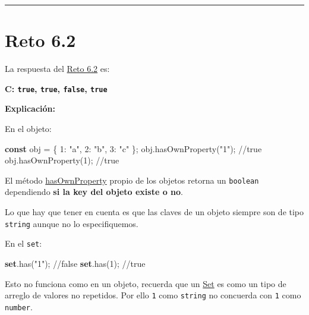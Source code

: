 \documentclass[
  letterpaper,
  DIV=11,
  numbers=noendperiod]{scrreprt}
\newenvironment{Shaded}{\begin{snugshade}}{\end{snugshade}}
\newcommand{\CommentTok}[1]{\textcolor[rgb]{0.37,0.37,0.37}{#1}}
\newcommand{\DecValTok}[1]{\textcolor[rgb]{0.68,0.00,0.00}{#1}}
\newcommand{\FunctionTok}[1]{\textcolor[rgb]{0.28,0.35,0.67}{#1}}
\newcommand{\KeywordTok}[1]{\textcolor[rgb]{0.00,0.23,0.31}{\textbf{#1}}}
\newcommand{\NormalTok}[1]{\textcolor[rgb]{0.00,0.23,0.31}{#1}}
\newcommand{\OperatorTok}[1]{\textcolor[rgb]{0.37,0.37,0.37}{#1}}
\newcommand{\StringTok}[1]{\textcolor[rgb]{0.13,0.47,0.30}{#1}}
\begin{document}
\begin{center}\rule{0.5\linewidth}{0.5pt}\end{center}

\section{Reto 6.2}\label{sec-sol-cap6-reto2}

La respuesta del \hyperref[sec-cap6-reto2]{Reto 6.2} es:

\textbf{C: \texttt{true}, \texttt{true}, \texttt{false}, \texttt{true}}

\textbf{Explicación:}

En el objeto:

\begin{Shaded}
\begin{Highlighting}[]
\KeywordTok{const}\NormalTok{ obj }\OperatorTok{=}\NormalTok{ \{ }\DecValTok{1}\OperatorTok{:} \StringTok{"a"}\OperatorTok{,} \DecValTok{2}\OperatorTok{:} \StringTok{"b"}\OperatorTok{,} \DecValTok{3}\OperatorTok{:} \StringTok{"c"}\NormalTok{ \}}\OperatorTok{;}
\NormalTok{obj}\OperatorTok{.}\FunctionTok{hasOwnProperty}\NormalTok{(}\StringTok{"1"}\NormalTok{)}\OperatorTok{;} \CommentTok{//true}
\NormalTok{obj}\OperatorTok{.}\FunctionTok{hasOwnProperty}\NormalTok{(}\DecValTok{1}\NormalTok{)}\OperatorTok{;} \CommentTok{//true}
\end{Highlighting}
\end{Shaded}

El método \hyperref[glos-hasownproperty]{hasOwnProperty} propio de los
objetos retorna un \texttt{boolean} dependiendo \textbf{si la key del
objeto existe o no}.

Lo que hay que tener en cuenta es que las claves de un objeto siempre
son de tipo \texttt{string} aunque no lo especifiquemos.

En el \texttt{set}:

\begin{Shaded}
\begin{Highlighting}[]
\KeywordTok{set}\OperatorTok{.}\FunctionTok{has}\NormalTok{(}\StringTok{"1"}\NormalTok{)}\OperatorTok{;} \CommentTok{//false}
\KeywordTok{set}\OperatorTok{.}\FunctionTok{has}\NormalTok{(}\DecValTok{1}\NormalTok{)}\OperatorTok{;} \CommentTok{//true}
\end{Highlighting}
\end{Shaded}

Esto no funciona como en un objeto, recuerda que un
\hyperref[glos-set]{Set} es como un tipo de arreglo de valores no
repetidos. Por ello \texttt{1} como \texttt{string} no concuerda con
\texttt{1} como \texttt{number}.
\end{document}
